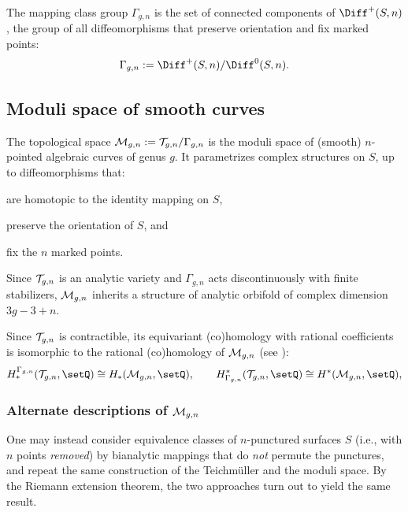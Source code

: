 \begin{definition}\label{dfn:mapping-class-group}
  The mapping class group $\Gamma_{g,n}$ is the set of connected components
  of $\Diff^+(S, n)$, the group of all diffeomorphisms that preserve
  orientation and fix marked points:
  \begin{equation*}
    \Gamma_{g,n} := \Diff^+ (S, n) / \Diff^0(S, n).
  \end{equation*}
\end{definition}


\subsection{Moduli space of smooth curves}
\label{sec:Mgn}

\begin{definition}
  The topological space $\mathcal{M}_{g,n} := \mathcal{T}_{g,n} / \Gamma_{g,n}$ is the
  moduli space of (smooth) $n$-pointed algebraic curves of genus $g$.
  It parametrizes complex structures on $S$, up to
  diffeomorphisms that:
  \begin{inparaenum}
  \item are homotopic to the identity mapping on $S$,
  \item preserve the orientation of $S$, and
  \item fix the $n$ marked points.
  \end{inparaenum}
\end{definition}
Since $\mathcal{T}_{g,n}$ is an analytic variety and $\Gamma_{g,n}$ acts
discontinuously with finite stabilizers, $\mathcal{M}_{g,n}$ inherits a
structure of analytic orbifold of complex dimension $3g - 3 + n$.

Since $\mathcal{T}_{g,n}$ is contractible, its equivariant (co)homology with
rational coefficients is isomorphic to the rational (co)homology of
$\mathcal{M}_{g,n}$ (see \cite[VII.7.7]{brown}):
\begin{equation}
  \label{eq:rational-homology-of-Mgn-from-equivariant-homology-of-Tgn}
  H^{\Gamma_{g,n}}_*(\T_{g,n}, \setQ) \cong H_*(\M_{g,n}, \setQ),
  \qquad
  H_{\Gamma_{g,n}}^*(\T_{g,n}, \setQ) \cong H^*(\M_{g,n}, \setQ),
\end{equation}

\subsubsection{Alternate descriptions of $\mathcal{M}_{g,n}$}
\label{sec:alternate-Mgn}
One may instead consider equivalence classes of $n$-punctured surfaces
$S$ (i.e., with $n$ points \emph{removed}) by bianalytic mappings that
do \emph{not} permute the punctures, and repeat the same construction
of the Teichm\"uller and the moduli space.  By the Riemann extension
theorem, the two approaches turn out to yield the same result.

